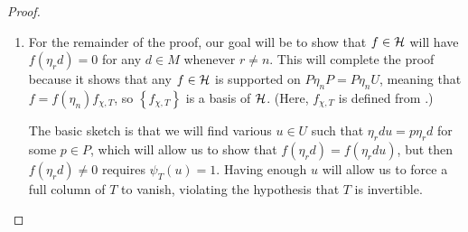 \begin{proof}
\begin{enumerate}

		\item For the remainder of the proof, our goal will be to show that $f\in\mathcal{H}$ will have $f(\eta_rd)=0$ for any $d\in M$ whenever $r\ne n$. This will complete the proof because it shows that any $f\in\mathcal{H}$ is supported on $P\eta_nP=P\eta_nU$, meaning that $f=f(\eta_n)f_{\chi,T}$, so $\left\{f_{\chi,T}\right\}$ is a basis of $\mathcal{H}$. (Here, $f_{\chi,T}$ is defined from .)

		The basic sketch is that we will find various $u\in U$ such that $\eta_rdu=p\eta_rd$ for some $p\in P$, which will allow us to show that $f(\eta_rd)=f(\eta_rdu)$, but then $f(\eta_rd)\ne0$ requires $\psi_T(u)=1$. Having enough $u$ will allow us to force a full column of $T$ to vanish, violating the hypothesis that $T$ is invertible.


\end{enumerate}
\end{proof}
